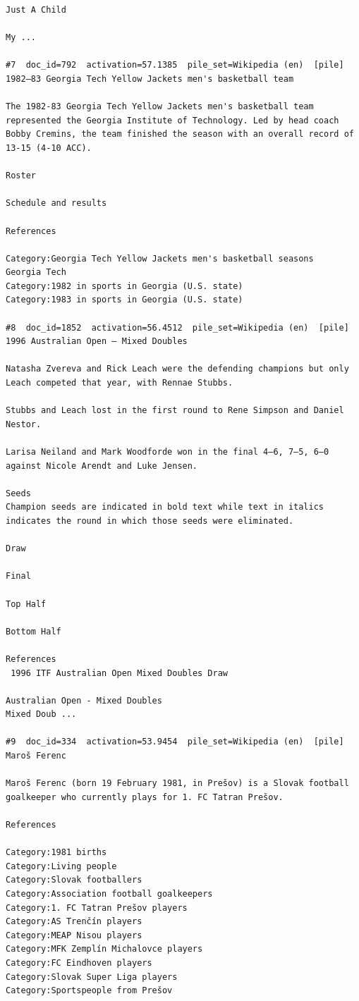 \begin{verbatim}
Just A Child

My ...

#7  doc_id=792  activation=57.1385  pile_set=Wikipedia (en)  [pile]
1982–83 Georgia Tech Yellow Jackets men's basketball team

The 1982-83 Georgia Tech Yellow Jackets men's basketball team represented the Georgia Institute of Technology. Led by head coach Bobby Cremins, the team finished the season with an overall record of 13-15 (4-10 ACC).

Roster

Schedule and results

References 

Category:Georgia Tech Yellow Jackets men's basketball seasons
Georgia Tech
Category:1982 in sports in Georgia (U.S. state)
Category:1983 in sports in Georgia (U.S. state)

#8  doc_id=1852  activation=56.4512  pile_set=Wikipedia (en)  [pile]
1996 Australian Open – Mixed Doubles

Natasha Zvereva and Rick Leach were the defending champions but only Leach competed that year, with Rennae Stubbs.

Stubbs and Leach lost in the first round to Rene Simpson and Daniel Nestor.

Larisa Neiland and Mark Woodforde won in the final 4–6, 7–5, 6–0 against Nicole Arendt and Luke Jensen.

Seeds
Champion seeds are indicated in bold text while text in italics indicates the round in which those seeds were eliminated.

Draw

Final

Top Half

Bottom Half

References
 1996 ITF Australian Open Mixed Doubles Draw

Australian Open - Mixed Doubles
Mixed Doub ...

#9  doc_id=334  activation=53.9454  pile_set=Wikipedia (en)  [pile]
Maroš Ferenc

Maroš Ferenc (born 19 February 1981, in Prešov) is a Slovak football goalkeeper who currently plays for 1. FC Tatran Prešov.

References

Category:1981 births
Category:Living people
Category:Slovak footballers
Category:Association football goalkeepers
Category:1. FC Tatran Prešov players
Category:AS Trenčín players
Category:MEAP Nisou players
Category:MFK Zemplín Michalovce players
Category:FC Eindhoven players
Category:Slovak Super Liga players
Category:Sportspeople from Prešov


\end{verbatim}
